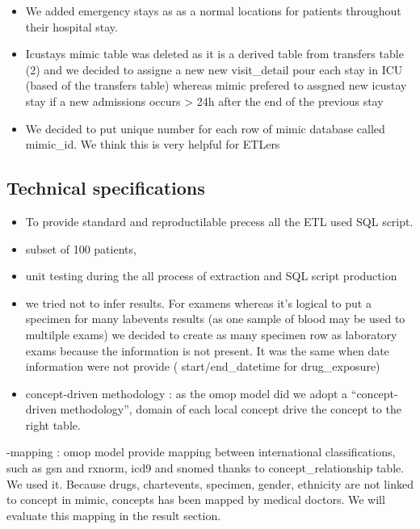 \begin{itemize}
\tightlist
\item
  We added emergency stays as as a normal locations for patients
  throughout their hospital stay.
\item
  Icustays mimic table was deleted as it is a derived table from
  transfers table (2) and we decided to assigne a new new visit\_detail
  pour each stay in ICU (based of the transfers table) whereas mimic
  prefered to assgned new icustay stay if a new admissions occurs
  \textgreater{} 24h after the end of the previous stay
\item
  We decided to put unique number for each row of mimic database called
  mimic\_id. We think this is very helpful for ETLers
\end{itemize}

\subsection{Technical specifications}\label{technical-specifications}

\begin{itemize}
\tightlist
\item
  To provide standard and reproductilable precess all the ETL used SQL
  script.
\item
  subset of 100 patients,
\item
  unit testing during the all process of extraction and SQL script
  production
\item
  we tried not to infer results. For examens whereas it's logical to put
  a specimen for many labevents results (as one sample of blood may be
  used to multilple exams) we decided to create as many specimen row as
  laboratory exams because the information is not present. It was the
  same when date information were not provide ( start/end\_datetime for
  drug\_exposure)
\item
  concept-driven methodology : as the omop model did we adopt a
  ``concept-driven methodology'', domain of each local concept drive the
  concept to the right table.
\end{itemize}

-mapping : omop model provide mapping between international
classifications, such as gsn and rxnorm, icd9 and snomed thanks to
concept\_relationship table. We used it. Because drugs, chartevents,
specimen, gender, ethnicity are not linked to concept in mimic, concepts
has been mapped by medical doctors. We will evaluate this mapping in the
result section.

